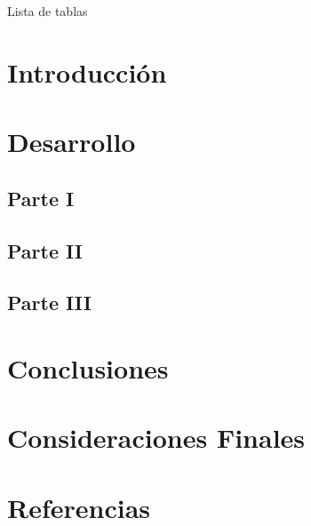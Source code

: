 \documentclass{extbook}
\renewcommand{\listoftables}{Lista de tablas}
\begin{document}

\tableofcontents
\listoffigures
\listoftables
\chapter{Introducción}

\chapter{Desarrollo}
\section{Parte I}

\section{Parte II}

\section{Parte III}

\chapter{Conclusiones}

\chapter{Consideraciones Finales}
\chapter{Referencias}

\end{document}
